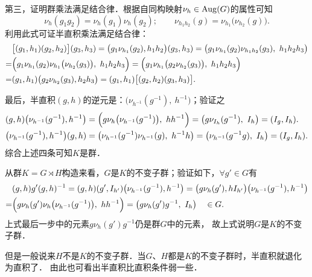 第三，证明群乘法满足结合律．根据自同构映射$\nu_h\in {\rm Aug}(G)$的属性可知
\begin{equation}
    \nu_{h} (g_1 g_2) = \nu_{h}(g_1) \nu_{h}(g_2); \qquad
    \nu_{h_1 h_2} (g) = \nu_{h_1}\bigl(\nu_{h_2}(g)\bigr) .
\end{equation}
利用此式可证半直积乘法满足结合律：
\setlength{\mathindent}{0em}
\begin{align*}
    &\bigl[(g_1, h_1)(g_2, h_2)\bigr] (g_3 ,h_3)
    =\bigl(g_1 \nu_{h_1}(g_2), h_1 h_2\bigr) (g_3, h_3)
    =\bigl( g_1 \nu_{h_1}(g_2) \nu_{h_1 h_2}(g_3) ,\  h_1 h_2 h_3 \bigr) \\
    =&\Bigl( g_1 \nu_{h_1}(g_2) \nu_{h_1}\bigl(\nu_{h_2} (g_3)\bigr) ,\  h_1 h_2 h_3 \Bigr)
    =\Bigl( g_1 \nu_{h_1} \bigl(g_2 \nu_{h_2} (g_3)\bigr)   ,\ h_1 h_2 h_3 \Bigr)\\
    =&( g_1, h_1) \bigl( g_2 \nu_{h_2} (g_3), h_2 h_3 \bigr)
    =( g_1, h_1) \bigl[( g_2, h_2) (g_3, h_3)\bigr].
\end{align*}\setlength{\mathindent}{2em}


最后，半直积$(g,h)$的逆元是：$\bigl(\nu_{h^{-1}}(g^{-1}),\ h^{-1}\bigr)$；验证之
\setlength{\mathindent}{0em}
\begin{align*}
    &(g,h) \bigl(\nu_{h^{-1}}(g^{-1}), h^{-1}\bigr) 
    = \Bigl(g \nu_{h}\bigl(\nu_{h^{-1}}(g^{-1})\bigr) , \ h h^{-1}\Bigr)
    =\bigl(g \nu_{I_h}(g^{-1}), \ I_h \bigr) = (I_g, I_h) . \\
    &\bigl(\nu_{h^{-1}}(g^{-1}), h^{-1}\bigr)  (g,h)
    =\bigl(\nu_{h^{-1}}(g^{-1}) \nu_{h^{-1}}(g), \ h^{-1} h\bigr) 
    =\bigl(\nu_{h^{-1}}(g^{-1} g) ,\ I_h\bigr) 
    =(I_g , I_h ) .
\end{align*} \setlength{\mathindent}{2em}
综合上述四条可知$K$是群．

从群$K=G \rtimes H$构造来看，$G$是$K$的不变子群；验证如下，$\forall g'\in G$有
\begin{align*}
    &(g,h) g' (g,h)^{-1} =
    (g,h) (g' , I_{h'}) \bigl(\nu_{h^{-1}}(g^{-1}), h^{-1} \bigr) =
    \bigl( g \nu_h (g'), h I_{h'}\bigr) \bigl(\nu_{h^{-1}}(g^{-1}), h^{-1}\bigr)  \\
    =& \Bigl(g \nu_h (g') \nu_h \bigl(\nu_{h^{-1}}(g^{-1})\bigr),\  h h^{-1}\Bigr) 
    = \bigl(g \nu_h (g') g^{-1},\ I_h\bigr)  \quad \in G.
\end{align*}
上式最后一步中的元素$g \nu_h (g') g^{-1}$仍是群$G$中的元素，
故上式说明$G$是$K$的不变子群．

但是一般说来$H$不是$K$的不变子群．当$G$、$H$都是$K$的不变子群时，半直积就退化为直积了．
由此也可看出半直积比直积条件弱一些．

